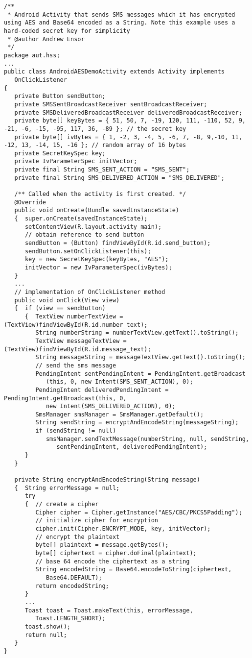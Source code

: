 \begin{lstlisting}[caption=SMS messaging encrypted with AES]
/**
 * Android Activity that sends SMS messages which it has encrypted using AES and Base64 encoded as a String. Note this example uses a hard-coded secret key for simplicity
 * @author Andrew Ensor
 */
package aut.hss;
...
public class AndroidAESDemoActivity extends Activity implements
   OnClickListener
{
   private Button sendButton;
   private SMSSentBroadcastReceiver sentBroadcastReceiver;
   private SMSDeliveredBroadcastReceiver deliveredBroadcastReceiver;
   private byte[] keyBytes = { 51, 50, 7, -19, 120, 111, -110, 52, 9, -21, -6, -15, -95, 117, 36, -89 }; // the secret key
   private byte[] ivBytes = { 1, -2, 3, -4, 5, -6, 7, -8, 9,-10, 11, -12, 13, -14, 15, -16 }; // random array of 16 bytes
   private SecretKeySpec key;
   private IvParameterSpec initVector;
   private final String SMS_SENT_ACTION = "SMS_SENT";
   private final String SMS_DELIVERED_ACTION = "SMS_DELIVERED";

   /** Called when the activity is first created. */
   @Override
   public void onCreate(Bundle savedInstanceState)
   {  super.onCreate(savedInstanceState);
      setContentView(R.layout.activity_main);
      // obtain reference to send button
      sendButton = (Button) findViewById(R.id.send_button);
      sendButton.setOnClickListener(this);
      key = new SecretKeySpec(keyBytes, "AES");
      initVector = new IvParameterSpec(ivBytes);
   }
   ...
   // implementation of OnClickListener method
   public void onClick(View view)
   {  if (view == sendButton)
      {  TextView numberTextView = (TextView)findViewById(R.id.number_text);
         String numberString = numberTextView.getText().toString();
         TextView messageTextView = (TextView)findViewById(R.id.message_text);
         String messageString = messageTextView.getText().toString();
         // send the sms message
         PendingIntent sentPendingIntent = PendingIntent.getBroadcast
            (this, 0, new Intent(SMS_SENT_ACTION), 0);
         PendingIntent deliveredPendingIntent = PendingIntent.getBroadcast(this, 0,
            new Intent(SMS_DELIVERED_ACTION), 0);
         SmsManager smsManager = SmsManager.getDefault();
         String sendString = encryptAndEncodeString(messageString);
         if (sendString != null)
            smsManager.sendTextMessage(numberString, null, sendString,
               sentPendingIntent, deliveredPendingIntent);
      }
   }

   private String encryptAndEncodeString(String message)
   {  String errorMessage = null;
      try
      {  // create a cipher
         Cipher cipher = Cipher.getInstance("AES/CBC/PKCS5Padding");
         // initialize cipher for encryption
         cipher.init(Cipher.ENCRYPT_MODE, key, initVector);
         // encrypt the plaintext
         byte[] plaintext = message.getBytes();
         byte[] ciphertext = cipher.doFinal(plaintext);
         // base 64 encode the ciphertext as a string
         String encodedString = Base64.encodeToString(ciphertext,
            Base64.DEFAULT);
         return encodedString;
      }
      ...
      Toast toast = Toast.makeText(this, errorMessage,
         Toast.LENGTH_SHORT);
      toast.show();
      return null;
   }
}
\end{lstlisting}
